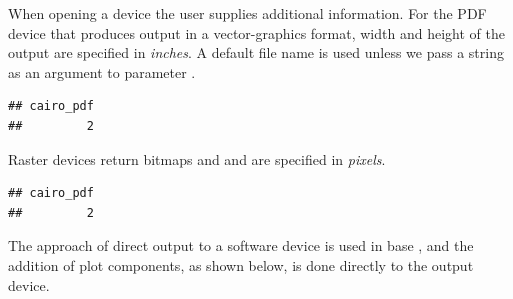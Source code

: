\documentclass[krantz2]{krantz}\usepackage{knitr}
\begin{document}
When opening a device the user supplies additional information. For the PDF device that produces output in a vector-graphics format, width and height of the output are specified in \emph{inches}. A default file name is used unless we pass a  string as an argument to parameter .

\begin{knitrout}\footnotesize
{}\color{fgcolor}\begin{kframe}
\begin{alltt}
\hlstd{(} \hlstd{=} \hlstd{,}  \hlstd{=} \hlstd{,}  \hlstd{=} \hlstd{,}  \hlstd{=} \hlstd{)}
 \hlopt{~}   
 \hlopt{~}   
\hlstd{()}
\end{alltt}
\begin{verbatim}
## cairo_pdf 
##         2
\end{verbatim}
\end{kframe}
\end{knitrout}

Raster devices return bitmaps and  and  are specified in \emph{pixels}.

\begin{knitrout}\footnotesize
{}\color{fgcolor}\begin{kframe}
\begin{alltt}
\hlstd{(} \hlstd{=} \hlstd{,}  \hlstd{=} \hlstd{,}  \hlstd{=} \hlstd{)}
 \hlopt{~}   
\hlstd{()}
\end{alltt}
\begin{verbatim}
## cairo_pdf 
##         2
\end{verbatim}
\end{kframe}
\end{knitrout}

The approach of direct output to a software device is used in base \Rlang,
and the addition of plot components, as shown below, is done directly to the output device.
\end{document}
